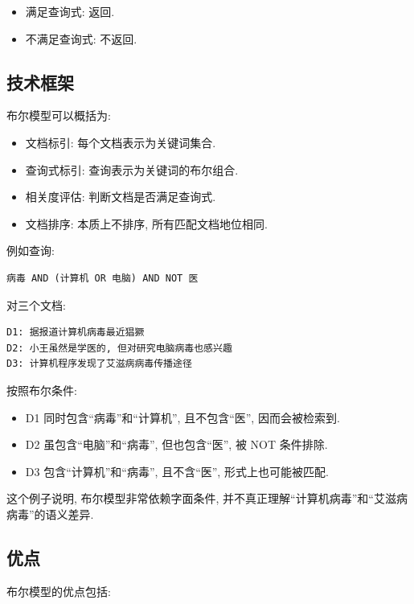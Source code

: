 \begin{itemize}
\item 满足查询式: 返回.
\item 不满足查询式: 不返回.
\end{itemize}

\subsection{技术框架}


布尔模型可以概括为:

\begin{itemize}
\item 文档标引: 每个文档表示为关键词集合.
\item 查询式标引: 查询表示为关键词的布尔组合.
\item 相关度评估: 判断文档是否满足查询式.
\item 文档排序: 本质上不排序, 所有匹配文档地位相同.
\end{itemize}

例如查询:

\begin{Verbatim}[breaklines=true,breakanywhere=true,fontsize=\small]
病毒 AND (计算机 OR 电脑) AND NOT 医
\end{Verbatim}

对三个文档:

\begin{Verbatim}[breaklines=true,breakanywhere=true,fontsize=\small]
D1: 据报道计算机病毒最近猖獗
D2: 小王虽然是学医的, 但对研究电脑病毒也感兴趣
D3: 计算机程序发现了艾滋病病毒传播途径
\end{Verbatim}

按照布尔条件:

\begin{itemize}
\item D1 同时包含“病毒”和“计算机”, 且不包含“医”, 因而会被检索到.
\item D2 虽包含“电脑”和“病毒”, 但也包含“医”, 被 NOT 条件排除.
\item D3 包含“计算机”和“病毒”, 且不含“医”, 形式上也可能被匹配.
\end{itemize}

这个例子说明, 布尔模型非常依赖字面条件, 并不真正理解“计算机病毒”和“艾滋病病毒”的语义差异.

\subsection{优点}


布尔模型的优点包括:


